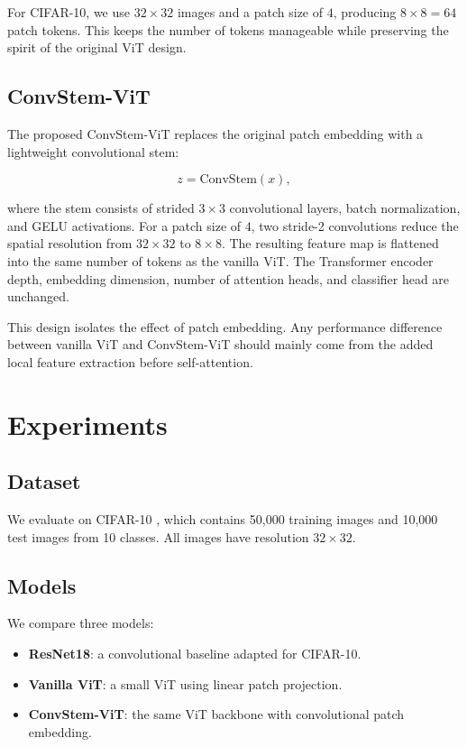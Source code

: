 \documentclass[letterpaper]{article}
\begin{document}
For CIFAR-10, we use $32 \times 32$ images and a patch size of $4$, producing
$8 \times 8 = 64$ patch tokens. This keeps the number of tokens manageable while
preserving the spirit of the original ViT design.

\subsection{ConvStem-ViT}

The proposed ConvStem-ViT replaces the original patch embedding with a
lightweight convolutional stem:

\begin{equation}
z = \mathrm{ConvStem}(x),
\end{equation}

where the stem consists of strided $3 \times 3$ convolutional layers, batch
normalization, and GELU activations. For a patch size of $4$, two stride-2
convolutions reduce the spatial resolution from $32 \times 32$ to $8 \times 8$.
The resulting feature map is flattened into the same number of tokens as the
vanilla ViT. The Transformer encoder depth, embedding dimension, number of
attention heads, and classifier head are unchanged.

This design isolates the effect of patch embedding. Any performance difference
between vanilla ViT and ConvStem-ViT should mainly come from the added local
feature extraction before self-attention.

\section{Experiments}

\subsection{Dataset}

We evaluate on CIFAR-10 \citep{krizhevsky2009learning}, which contains 50,000
training images and 10,000 test images from 10 classes. All images have
resolution $32 \times 32$.

\subsection{Models}

We compare three models:

\begin{itemize}
    \item \textbf{ResNet18}: a convolutional baseline adapted for CIFAR-10.
    \item \textbf{Vanilla ViT}: a small ViT using linear patch projection.
    \item \textbf{ConvStem-ViT}: the same ViT backbone with convolutional patch embedding.
\end{itemize}
\end{document}
